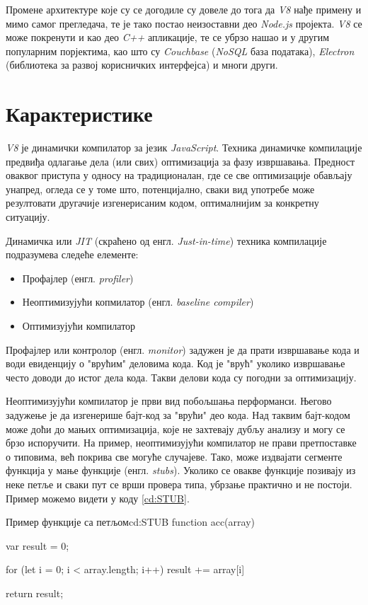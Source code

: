 \documentclass[12pt,oneside]{memoir}
\begin{document}
Промене архитектуре које су се догодиле су довеле до тога да \textit{V8} нађе примену и мимо самог прегледача, те је тако постао неизоставни део \textit{Node.js} пројекта.
\textit{V8} се може покренути и као део \textit{C++} апликације, те се убрзо нашао и у другим популарним порјектима, као што су \textit{Couchbase} (\textit{NoSQL} база података),
\textit{Electron} (библиотека за развој корисничких интерфејса) и многи други.

\section{Карактеристике} \label{chp:CHAR}

\textit{V8} је динамички компилатор за језик \textit{JavaScript}. Техника динамичке компилације предвиђа одлагање дела (или свих) оптимизација за фазу извршавања.
Предност оваквог приступа у односу на традиционалан, где се све оптимизације обављају унапред, огледа се у томе што, потенцијално, сваки вид употребе може резултовати
другачије изгенерисаним кодом, оптималнијим за конкретну ситуацију.

Динамичка или \textit{JIT} (скраћено од енгл. \textit{Just-in-time}) техника компилације подразумева следеће елементе:

\begin{itemize}
	\item Профајлер (енгл. \textit{profiler})
	\item Неоптимизујући копмилатор (енгл. \textit{baseline compiler})
	\item Оптимизујући компилатор
\end{itemize}

Профајлер или контролор (енгл. \textit{monitor}) задужен је да прати извршавање кода и води евиденцију о "врућим" деловима кода. Код је "врућ" уколико извршавање
често доводи до истог дела кода. Такви делови кода су погодни за оптимизацију.

Неоптимизујући компилатор је први вид побољшања перформанси. Његово задужење је да изгенерише бајт-код за "врући" део кода. Над таквим бајт-кодом може доћи до мањих оптимизација,
које не захтевају дубљу анализу и могу се брзо испоручити. На пример, неоптимизујући компилатор не прави претпоставке о типовима, већ покрива све могуће случајеве. Тако,
може издвајати сегменте функција у мање функције (енгл. \textit{stubs}). Уколико се овакве функције позивају из неке петље и сваки пут се врши провера типа, убрзање
практично и не постоји. Пример можемо видети у коду \ref{cd:STUB}.
\begin{code}{Пример функције са петљом}{cd:STUB}
	function acc(array) {
		var result = 0;

		for (let i = 0; i < array.length; i++) {
			result += array[i]
		}

		return result;
	}
\end{code}
\end{document}

